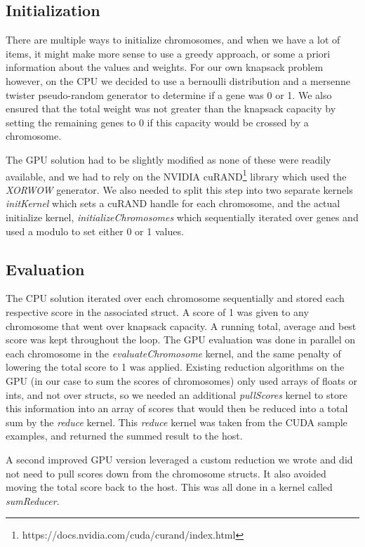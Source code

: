 \documentclass[11pt]{article}       %
\begin{document}
\subsection{Initialization}
There are multiple ways to initialize chromosomes, and when we have a lot of items, it might make more sense to use a greedy approach, or some a priori information about the values and weights. For our own knapsack problem however, on the CPU we decided to use a bernoulli distribution and a mersenne twister pseudo-random generator to determine if a gene was 0 or 1. We also ensured that the total weight was not greater than the knapsack capacity by setting the remaining genes to 0 if this capacity would be crossed by a chromosome.

The GPU solution had to be slightly modified as none of these were readily available, and we had to rely on the NVIDIA cuRAND\footnote[1]{https://docs.nvidia.com/cuda/curand/index.html} library which used the \textit{XORWOW} generator. We also needed to split this step into two separate kernels \textit{initKernel} which sets a cuRAND handle for each chromosome, and the actual initialize kernel, \textit{initializeChromosomes} which sequentially iterated over genes and used a modulo to set either 0 or 1 values.

\subsection{Evaluation}
The CPU solution iterated over each chromosome sequentially and stored each respective score in the associated struct. A score of 1 was given to any chromosome that went over knapsack capacity. A running total, average and best score was kept throughout the loop.
The GPU evaluation was done in parallel on each chromosome in the  \textit{evaluateChromosome} kernel, and the same penalty of lowering the total score to 1 was applied. Existing reduction algorithms on the GPU (in our case to sum the scores of chromosomes) only used arrays of floats or ints, and not over structs, so we needed an additional \textit{pullScores} kernel to store this information into an array of scores that would then be reduced into a total sum by the \textit{reduce} kernel. This \textit{reduce} kernel was taken from the CUDA sample examples, and returned the summed result to the host.

A second improved GPU version leveraged a custom reduction we wrote and did not need to pull scores down from the chromosome structs. It also avoided moving the total score back to the host. This was all done in a kernel called \textit{sumReducer}.
\end{document}
